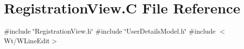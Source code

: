 \hypertarget{_registration_view_8_c}{}\section{Registration\+View.\+C File Reference}
\label{_registration_view_8_c}
{\ttfamily \#include \char`\"{}Registration\+View.\+h\char`\"{}}\newline
{\ttfamily \#include \char`\"{}User\+Details\+Model.\+h\char`\"{}}\newline
{\ttfamily \#include $<$Wt/\+W\+Line\+Edit$>$}\newline
